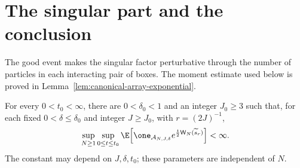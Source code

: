 \section{The singular part and the conclusion}
\label{sec:local-singular}
The good event makes the singular factor perturbative through the number of particles in each interacting pair of boxes.  The moment estimate used below is proved in Lemma~\ref{lem:canonical-array-exponential}.
\begin{lemma}
\label{lem:physical-local-count-bound}
For every $0<t_0<\infty$, there are $0<\delta_0<1$ and an integer $J_0\ge3$ such that, for each fixed $0<\delta\le\delta_0$ and integer $J\ge J_0$, with $r=(2J)^{-1}$,
\begin{equation}
 \sup_{N\ge1}\sup_{0\le t\le t_0}
 \E\Big[\one_{\mathcal A_{N,J,\delta}}
 e^{\frac t2\mathsf W_N(\widetilde s_r)}\Big]<\infty.
 \label{eq:physical-local-count-conclusion}
\end{equation}
The constant may depend on $J,\delta,t_0$; these parameters are independent of $N$.
\end{lemma}

